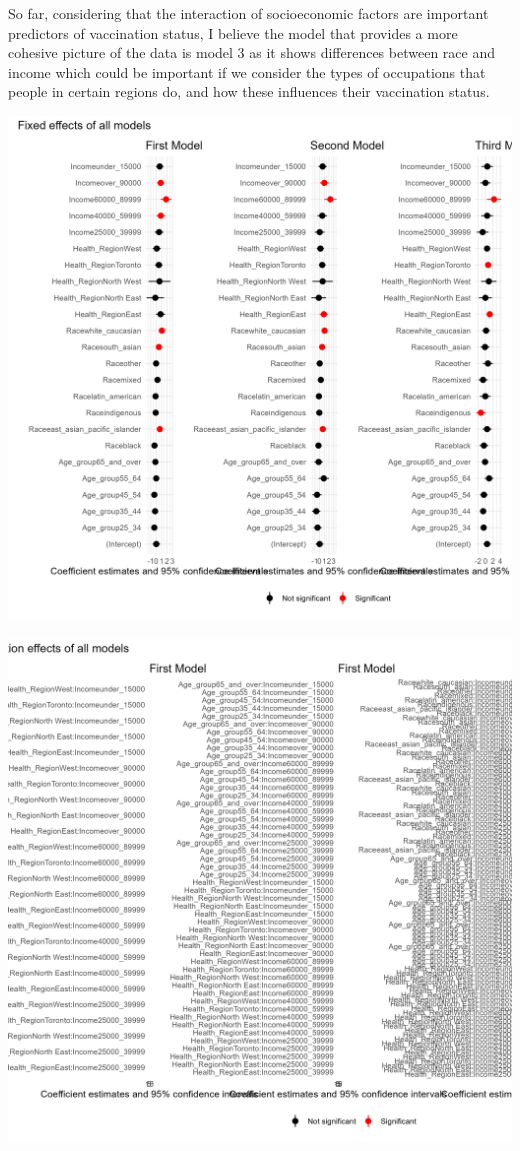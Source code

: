 \documentclass[
  letterpaper,
  DIV=11,
  numbers=noendperiod]{scrartcl}
\begin{document}
So far, considering that the interaction of socioeconomic factors are
important predictors of vaccination status, I believe the model that
provides a more cohesive picture of the data is model 3 as it shows
differences between race and income which could be important if we
consider the types of occupations that people in certain regions do, and
how these influences their vaccination status.

\includegraphics{Background_and_methods_Jan_12_files/figure-pdf/model-table-1.png}

\includegraphics{Background_and_methods_Jan_12_files/figure-pdf/model-table-2.png}
\end{document}
